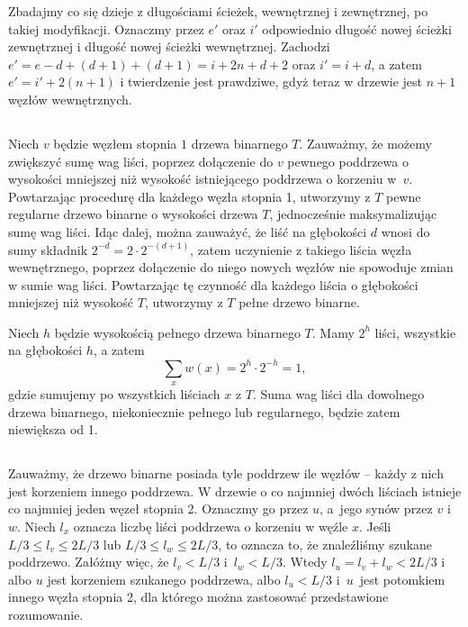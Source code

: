 Zbadajmy co się dzieje z długościami ścieżek, wewnętrznej i zewnętrznej, po takiej modyfikacji. Oznaczmy przez $e'$ oraz $i'$ odpowiednio długość nowej ścieżki zewnętrznej i długość nowej ścieżki wewnętrznej. Zachodzi $e'=e-d+(d+1)+(d+1)=i+2n+d+2$ oraz $i'=i+d$, a zatem $e'=i'+2(n+1)$ i twierdzenie jest prawdziwe, gdyż teraz w drzewie jest $n+1$ węzłów wewnętrznych.

\subsection{} %
Niech $v$ będzie węzłem stopnia $1$ drzewa binarnego $T$. Zauważmy, że możemy zwiększyć sumę wag liści, poprzez dołączenie do $v$ pewnego poddrzewa o wysokości mniejszej niż wysokość istniejącego poddrzewa o korzeniu w~$v$. Powtarzając procedurę dla każdego węzła stopnia 1, utworzymy z $T$ pewne regularne drzewo binarne o wysokości drzewa $T$, jednocześnie maksymalizując sumę wag liści. Idąc dalej, można zauważyć, że liść na głębokości $d$ wnosi do sumy składnik $2^{-d}=2\cdot2^{-(d+1)}$, zatem uczynienie z takiego liścia węzła wewnętrznego, poprzez dołączenie do niego nowych węzłów nie spowoduje zmian w sumie wag liści. Powtarzając tę czynność dla każdego liścia o głębokości mniejszej niż wysokość $T$, utworzymy z $T$ pełne drzewo binarne.

Niech $h$ będzie wysokością pełnego drzewa binarnego $T$. Mamy $2^h$ liści, wszystkie na głębokości $h$, a zatem
\[
	\sum_{x}w(x) = 2^h\cdot2^{-h} = 1,
\]
gdzie sumujemy po wszystkich liściach $x$ z $T$. Suma wag liści dla dowolnego drzewa binarnego, niekoniecznie pełnego lub regularnego, będzie zatem niewiększa od 1.

\subsection{} %
Zauważmy, że drzewo binarne posiada tyle poddrzew ile węzłów -- każdy z nich jest korzeniem innego poddrzewa. W drzewie o co najmniej dwóch liściach istnieje co najmniej jeden węzeł stopnia 2. Oznaczmy go przez $u$, a~jego synów przez $v$ i $w$.  Niech $l_x$ oznacza liczbę liści poddrzewa o korzeniu w węźle $x$. Jeśli $L/3\le l_v\le 2L/3$ lub $L/3\le l_w\le 2L/3$, to oznacza to, że znaleźliśmy szukane poddrzewo. Załóżmy więc, że $l_v<L/3$ i~$l_w<L/3$. Wtedy $l_u=l_v+l_w<2L/3$ i albo $u$ jest korzeniem szukanego poddrzewa, albo $l_u<L/3$ i~$u$~jest potomkiem innego węzła stopnia 2, dla którego można zastosować przedstawione rozumowanie.


